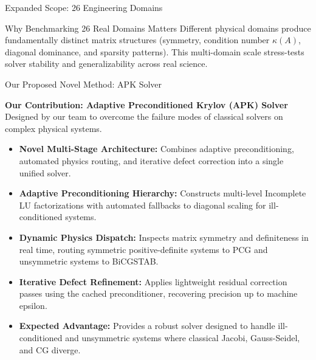 \documentclass[aspectratio=169,10pt]{beamer}
\begin{document}
\begin{frame}{Expanded Scope: 26 Engineering Domains}
  \vspace{0.35em}
  \begin{block}{\small Why Benchmarking 26 Real Domains Matters}
    \footnotesize Different physical domains produce fundamentally distinct matrix structures (symmetry, condition number $\kappa(A)$, diagonal dominance, and sparsity patterns). This multi-domain scale stress-tests solver stability and generalizability across real science.
  \end{block}
\end{frame}

\begin{frame}{Our Proposed Novel Method: APK Solver}
  \vspace{-0.15em}
  \colorbox{LSlightgold}{\parbox{0.98\linewidth}{\vspace{0.25em}
    {\bfseries\normalsize\color{LSnavy} Our Contribution: Adaptive Preconditioned Krylov (APK) Solver}\\[0.15em]
    {\footnotesize\color{LSgray} Designed by our team to overcome the failure modes of classical solvers on complex physical systems.}
    \vspace{0.25em}}}
  \vspace{0.6em}

  \small
  \begin{itemize}\setlength\itemsep{0.75em}
    \item \textbf{\color{LSteal}Novel Multi-Stage Architecture:}
      Combines adaptive preconditioning, automated physics routing, and iterative defect correction into a single unified solver.

    \item \textbf{\color{LSteal}Adaptive Preconditioning Hierarchy:}
      Constructs multi-level Incomplete LU factorizations with automated fallbacks to diagonal scaling for ill-conditioned systems.

    \item \textbf{\color{LSteal}Dynamic Physics Dispatch:}
      Inspects matrix symmetry and definiteness in real time, routing symmetric positive-definite systems to PCG and unsymmetric systems to BiCGSTAB.

    \item \textbf{\color{LSteal}Iterative Defect Refinement:}
      Applies lightweight residual correction passes using the cached preconditioner, recovering precision up to machine epsilon.

    \item \textbf{\color{LSteal}Expected Advantage:}
      Provides a robust solver designed to handle ill-conditioned and unsymmetric systems where classical Jacobi, Gauss-Seidel, and CG diverge.
  \end{itemize}
\end{frame}
\end{document}
